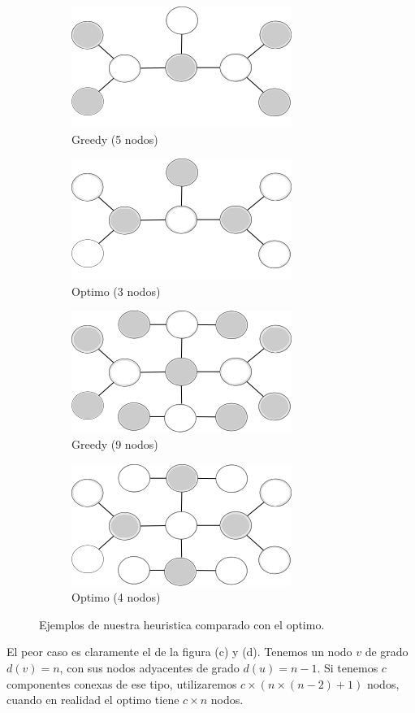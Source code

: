 \begin{figure}[ht]
\centering
\begin{subfigure}[b]{0.4\textwidth}
	\includegraphics[scale=0.6]{images/greedy_fail.png}
	\caption{Greedy (5 nodos)}
\end{subfigure}
\begin{subfigure}[b]{0.4\textwidth}
	\includegraphics[scale=0.6]{images/greedy_best.png}
	\caption{Optimo (3 nodos)}
\end{subfigure}

\begin{subfigure}[b]{0.4\textwidth}
	\includegraphics[scale=0.6]{images/greedy_fail2.png}
	\caption{Greedy (9 nodos)}
\end{subfigure}
\begin{subfigure}[b]{0.4\textwidth}
	\includegraphics[scale=0.6]{images/greedy_best2.png}
	\caption{Optimo (4 nodos)}
\end{subfigure}
\caption{Ejemplos de nuestra heuristica comparado con el optimo.}
\end{figure}

El peor caso es claramente el de la figura (c) y (d). Tenemos un nodo $v$ de grado $d(v) = n$, con sus nodos adyacentes de grado $d(u) = n - 1$. Si tenemos $c$ componentes conexas de ese tipo, utilizaremos $c \times (n \times (n-2) + 1)$ nodos, cuando en realidad el optimo tiene $c \times n$ nodos.



